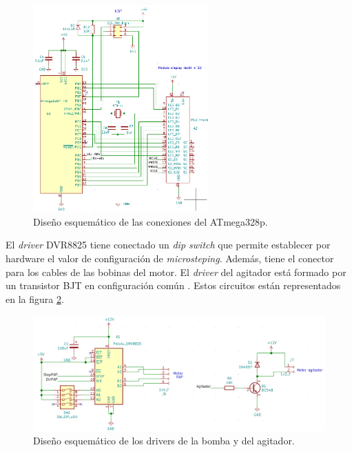 \begin{figure}[htbp]
	\centering
	\includegraphics[width=0.6\textwidth]{./Figures/esquematicoAtmega.png}
	\caption{Diseño esquemático de las conexiones del ATmega328p.}
	\label{fig:esquematicoAtmega}
\end{figure}

\vspace{3 cm}

El \textit{driver} DVR8825 tiene conectado un \textit{dip switch} que permite establecer por hardware el valor de configuración de \textit{microsteping}. Además, tiene el conector para los cables de las bobinas del motor. El \textit{driver} del agitador está formado por un transistor BJT en configuración común \cite{BOOK:3}. Estos circuitos están representados en la figura \ref{fig:esquematicoMotores}.

\begin{figure}[htbp]
	\centering
	\includegraphics[width=1.0\textwidth]{./Figures/esquematicoMotores.png}
	\caption{Diseño esquemático de los drivers de la bomba y del agitador.}
	\label{fig:esquematicoMotores}
\end{figure}

